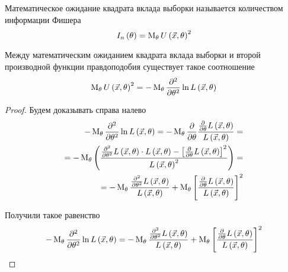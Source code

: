 \begin{definition}
  \label{def:fisherInformation}
  Математическое ожидание квадрата вклада выборки называется
  количеством информации Фишера
  $$I_n\left(\theta\right)=
    \operatorname{M}_{\theta} U\left( \vec{x},\theta \right)^2$$
\end{definition}
\begin{remark}
  Между математическим ожиданием квадрата вклада выборки и второй производной
  функции правдоподобия существует такое соотношение
  $$\operatorname{M}_{\theta} U\left( \vec{x},\theta \right)^2
    =-\operatorname{M}_{\theta} 
      \frac{\partial^2}{\partial\theta^2}
      \ln{L\left( \vec{x},\theta \right)}$$
\end{remark}
\begin{proof}
  Будем доказывать справа налево
  \begin{align*}
    -\operatorname{M}_{\theta} 
      \frac{\partial^2}{\partial\theta^2}
      \ln{L\left( \vec{x},\theta \right)}=
    -\operatorname{M}_{\theta} 
      \frac{\partial}{\partial\theta}
      \frac{\frac{\partial}{\partial\theta}L\left(\vec{x},\theta\right)}
        {L\left(\vec{x},\theta\right)}=\\
    =-\operatorname{M}_{\theta} 
      \left(
      \frac{\frac{\partial^2}{\partial\theta^2}
        L\left(\vec{x},\theta\right)\cdot L\left(\vec{x},\theta\right)-
          \left[\frac{\partial}{\partial\theta}
            L\left(\vec{x},\theta\right)\right]^2
        }
        {L\left(\vec{x},\theta\right)^2}
        \right)=\\
    =-\operatorname{M}_{\theta} 
      \frac{\frac{\partial^2}{\partial\theta^2}
        L\left(\vec{x},\theta\right)}
        {L\left(\vec{x},\theta\right)}
      +\operatorname{M}_{\theta} 
        \left[\frac{\frac{\partial}{\partial\theta}
          L\left(\vec{x},\theta\right)}
          {L\left(\vec{x},\theta\right)}\right]^2
  \end{align*}

  Получили такое равенство
  \begin{equation}\label{eq:ULProofStart}
    - \operatorname{M}_{\theta} \frac{\partial^2}{\partial\theta^2}
      \ln{L\left( \vec{x},\theta \right)}
    = -\operatorname{M}_{\theta} 
      \frac{\frac{\partial^2}{\partial\theta^2}
        L\left(\vec{x},\theta\right)}
        {L\left(\vec{x},\theta\right)}
      +\operatorname{M}_{\theta} 
        \left[\frac{\frac{\partial}{\partial\theta}
          L\left(\vec{x},\theta\right)}
          {L\left(\vec{x},\theta\right)}\right]^2
  \end{equation}
    

\end{proof}
